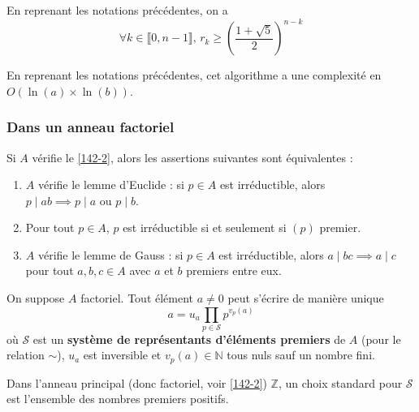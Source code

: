 	
	\begin{proposition}
		En reprenant les notations précédentes, on a
		\[ \forall k \in \llbracket 0,n-1 \rrbracket, \, r_k \geq \left( \frac{1+\sqrt{5}}{2} \right)^{n-k} \]
	\end{proposition}
	
	\begin{corollary}
		En reprenant les notations précédentes, cet algorithme a une complexité en $O(\ln(a) \times \ln(b))$.
	\end{corollary}
	
	\subsubsection{Dans un anneau factoriel}
	
	
	\begin{proposition}
		Si $A$ vérifie le \cref{142-2}, alors les assertions suivantes sont équivalentes :
		\begin{enumerate}[label=(\roman*)]
			\item $A$ vérifie le lemme d'Euclide : si $p \in A$ est irréductible, alors $p \mid ab \implies p \mid a \text { ou } p \mid b$.
			\item Pour tout $p \in A$, $p$ est irréductible si et seulement si $(p)$ premier.
			\item $A$ vérifie le lemme de Gauss : si $p \in A$ est irréductible, alors $a \mid bc \implies a \mid c$ pour tout $a, b, c \in A$ avec $a$ et $b$ premiers entre eux.
		\end{enumerate}
	\end{proposition}
	
	\reference[ULM18]{65}
	
	\begin{proposition}
		On suppose $A$ factoriel. Tout élément $a \neq 0$ peut s'écrire de manière unique
		\[ a = u_a \prod_{p \in \mathcal{S}} p^{v_p(a)} \]
		où $\mathcal{S}$ est un \textbf{système de représentants d'éléments premiers} de $A$ (pour le relation $\sim$), $u_a$ est inversible et $v_p(a) \in \mathbb{N}$ tous nuls sauf un nombre fini.
	\end{proposition}
	
	\begin{example}
		Dans l'anneau principal (donc factoriel, voir \cref{142-2}) $\mathbb{Z}$, un choix standard pour $\mathcal{S}$ est l'ensemble des nombres premiers positifs.
	\end{example}
	
